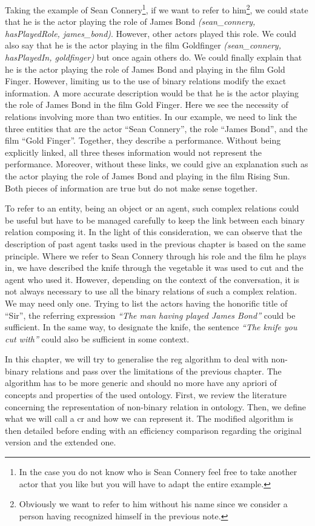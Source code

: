 Taking the example of Sean Connery\footnote{In the case you do not know who is Sean Connery feel free to take another actor that you like but you will have to adapt the entire example.}, if we want to refer to him\footnote{Obviously we want to refer to him without his name since we consider a person having recognized himself in the previous note.}, we could state that he is the actor playing the role of James Bond \textit{(sean\_connery, hasPlayedRole, james\_bond)}. However, other actors played this role. We could also say that he is the actor playing in the film Goldfinger \textit{(sean\_connery, hasPlayedIn, goldfinger)} but once again others do. We could finally explain that he is the actor playing the role of James Bond and playing in the film Gold Finger. However, limiting us to the use of binary relations modify the exact information. A more accurate description would be that he is the actor playing the role of James Bond in the film Gold Finger. Here we see the necessity of relations involving more than two entities. In our example, we need to link the three entities that are the actor ``Sean Connery'', the role ``James Bond'', and the film ``Gold Finger''. Together, they describe a performance. Without being explicitly linked, all three theses information would not represent the performance. Moreover, without these links, we could give an explanation such as the actor playing the role of James Bond and playing in the film Rising Sun. Both pieces of information are true but do not make sense together.

To refer to an entity, being an object or an agent, such complex relations could be useful but have to be managed carefully to keep the link between each binary relation composing it. In the light of this consideration, we can observe that the description of past agent tasks used in the previous chapter is based on the same principle. Where we refer to Sean Connery through his role and the film he plays in, we have described the knife through the vegetable it was used to cut and the agent who used it. However, depending on the context of the conversation, it is not always necessary to use all the binary relations of such a complex relation. We may need only one. Trying to list the actors having the honorific title of ``Sir'', the referring expression \textit{``The man having played James Bond''} could be sufficient. In the same way, to designate the knife, the sentence \textit{``The knife you cut with''} could also be sufficient in some context.

In this chapter, we will try to generalise the \acrshort{reg} algorithm to deal with non-binary relations and pass over the limitations of the previous chapter. The algorithm has to be more generic and should no more have any apriori of concepts and properties of the used ontology.
First, we review the literature concerning the representation of non-binary relation in ontology. Then, we define what we will call a \acrlong{cr} and how we can represent it. The modified algorithm is then detailed before ending with an efficiency comparison regarding the original version and the extended one.

